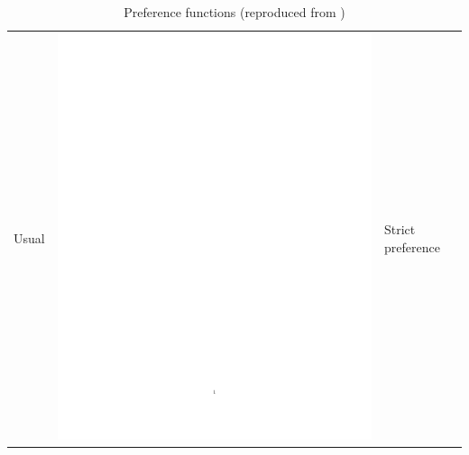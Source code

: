 \begin{enumerate}
\begin{table}[h!]
\caption{Preference functions (reproduced from \cite{BraMar2002})}
\begin{center}
\begin{tabular}{|l|c|b{4.2cm}|}
\hline Usual & \includegraphics[page=2,trim=7.5cm 13.8cm 3.5cm 6.5cm,clip,scale=0.36]{prom_usual_pdf} & Strict preference\\

\end{tabular}
\end{center}
\end{table}
\end{enumerate}

